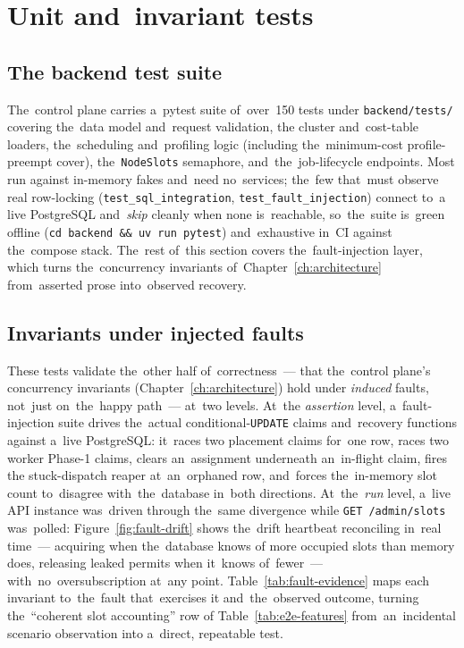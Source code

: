 \section{Unit and~invariant tests}
\label{sec:unit-tests}

\subsection{The backend test suite}

The~control plane carries a~pytest suite of~over~150 tests under
\texttt{backend/tests/} covering the~data model and~request validation, the
cluster and~cost-table loaders, the~scheduling and~profiling logic (including
the~minimum-cost profile-preempt cover), the~\texttt{NodeSlots} semaphore,
and~the~job-lifecycle endpoints.  Most run against in-memory fakes and~need
no~services; the~few that~must observe real row-locking
(\texttt{test\_sql\_integration}, \texttt{test\_fault\_injection}) connect to~a
live PostgreSQL and~\emph{skip} cleanly when none is~reachable, so~the~suite
is~green offline (\texttt{cd backend \&\& uv run pytest}) and~exhaustive in~CI
against the~compose stack.  The~rest of~this section covers the~fault-injection
layer, which turns the~concurrency invariants of~Chapter~\ref{ch:architecture}
from~asserted prose into~observed recovery.

\subsection{Invariants under injected faults}
\label{sec:fault-injection}

These tests validate the~other half of~correctness~--- that the~control
plane's concurrency invariants (Chapter~\ref{ch:architecture}) hold under
\emph{induced} faults, not~just on~the~happy path~--- at~two levels.  At~the
\emph{assertion} level, a~fault-injection suite drives the~actual
conditional-\texttt{UPDATE} claims and~recovery functions against a~live
PostgreSQL: it~races two placement claims for~one row, races two worker
Phase-1 claims, clears an~assignment underneath an~in-flight claim, fires the
stuck-dispatch reaper at~an~orphaned row, and~forces the~in-memory slot count
to~disagree with~the~database in~both directions.  At~the~\emph{run} level,
a~live API instance was~driven through the~same divergence while \texttt{GET
/admin/slots} was~polled: Figure~\ref{fig:fault-drift} shows the~drift
heartbeat reconciling in~real time~--- acquiring when the~database knows of
more occupied slots than memory does, releasing leaked permits when it~knows
of~fewer~--- with~no~oversubscription at~any point.
Table~\ref{tab:fault-evidence} maps each invariant to~the~fault that~exercises
it and~the~observed outcome, turning the~``coherent slot accounting'' row of
Table~\ref{tab:e2e-features} from~an~incidental scenario observation into
a~direct, repeatable test.


